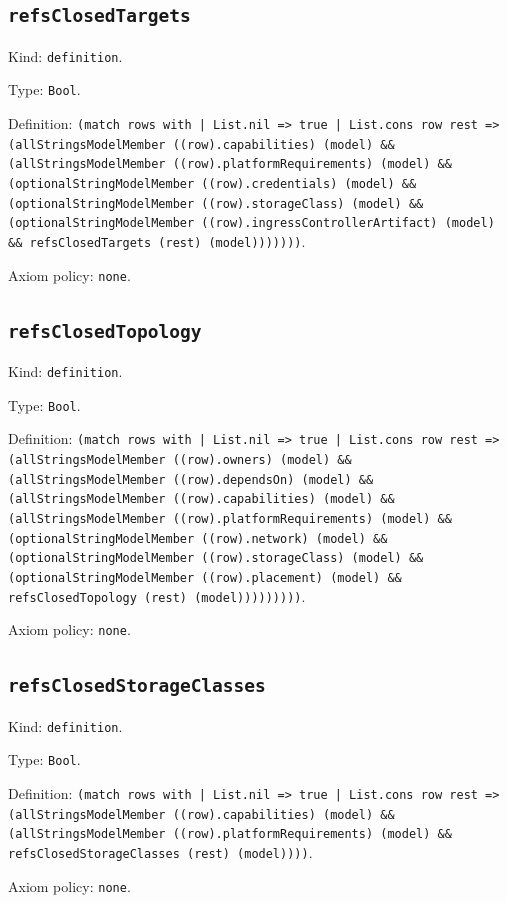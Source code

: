 \documentclass[11pt]{article}
\begin{document}
\subsection*{\texttt{refsClosedTargets}}
\noindent Kind: \texttt{definition}.\par
\noindent Type: \texttt{Bool}.\par
\noindent Definition: \texttt{(match rows with | List.nil => true | List.cons row rest => (allStringsModelMember ((row).capabilities) (model) \&\& (allStringsModelMember ((row).platformRequirements) (model) \&\& (optionalStringModelMember ((row).credentials) (model) \&\& (optionalStringModelMember ((row).storageClass) (model) \&\& (optionalStringModelMember ((row).ingressControllerArtifact) (model) \&\& refsClosedTargets (rest) (model)))))))}.\par
\noindent Axiom policy: \texttt{none}.\par
\subsection*{\texttt{refsClosedTopology}}
\noindent Kind: \texttt{definition}.\par
\noindent Type: \texttt{Bool}.\par
\noindent Definition: \texttt{(match rows with | List.nil => true | List.cons row rest => (allStringsModelMember ((row).owners) (model) \&\& (allStringsModelMember ((row).dependsOn) (model) \&\& (allStringsModelMember ((row).capabilities) (model) \&\& (allStringsModelMember ((row).platformRequirements) (model) \&\& (optionalStringModelMember ((row).network) (model) \&\& (optionalStringModelMember ((row).storageClass) (model) \&\& (optionalStringModelMember ((row).placement) (model) \&\& refsClosedTopology (rest) (model)))))))))}.\par
\noindent Axiom policy: \texttt{none}.\par
\subsection*{\texttt{refsClosedStorageClasses}}
\noindent Kind: \texttt{definition}.\par
\noindent Type: \texttt{Bool}.\par
\noindent Definition: \texttt{(match rows with | List.nil => true | List.cons row rest => (allStringsModelMember ((row).capabilities) (model) \&\& (allStringsModelMember ((row).platformRequirements) (model) \&\& refsClosedStorageClasses (rest) (model))))}.\par
\noindent Axiom policy: \texttt{none}.\par
\end{document}
